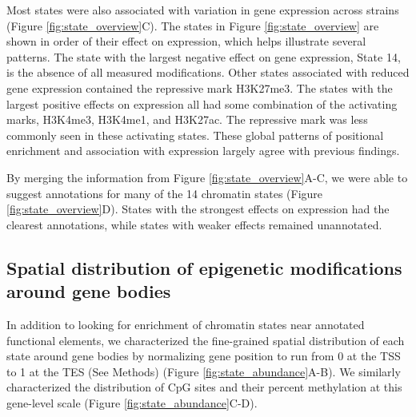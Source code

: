 \documentclass[
  11pt,
]{article}
\begin{document}
Most states were also associated with variation in gene expression
across strains (Figure \ref{fig:state_overview}C). The states in Figure
\ref{fig:state_overview} are shown in order of their effect on
expression, which helps illustrate several patterns. The state with the
largest negative effect on gene expression, State 14, is the absence of
all measured modifications. Other states associated with reduced gene
expression contained the repressive mark H3K27me3. The states with the
largest positive effects on expression all had some combination of the
activating marks, H3K4me3, H3K4me1, and H3K27ac. The repressive mark was
less commonly seen in these activating states. These global patterns of
positional enrichment and association with expression largely agree with
previous findings.

By merging the information from Figure \ref{fig:state_overview}A-C, we
were able to suggest annotations for many of the 14 chromatin states
(Figure \ref{fig:state_overview}D). States with the strongest effects on
expression had the clearest annotations, while states with weaker
effects remained unannotated.

\hypertarget{spatial-distribution-of-epigenetic-modifications-around-gene-bodies}{%
\subsection{Spatial distribution of epigenetic modifications around gene
bodies}\label{spatial-distribution-of-epigenetic-modifications-around-gene-bodies}}

In addition to looking for enrichment of chromatin states near annotated
functional elements, we characterized the fine-grained spatial
distribution of each state around gene bodies by normalizing gene
position to run from 0 at the TSS to 1 at the TES (See Methods) (Figure
\ref{fig:state_abundance}A-B). We similarly characterized the
distribution of CpG sites and their percent methylation at this
gene-level scale (Figure \ref{fig:state_abundance}C-D).
\end{document}

